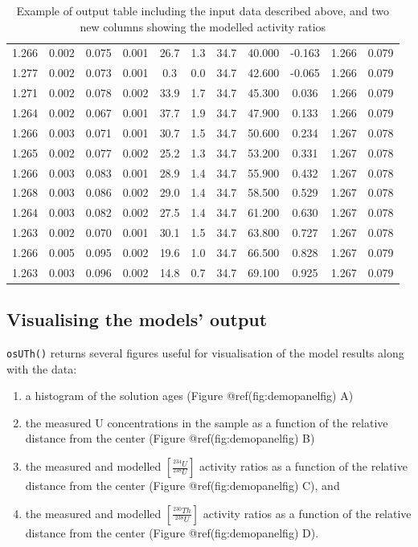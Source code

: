 \documentclass[]{elsarticle} %
\providecommand{\tightlist}{%
  \setlength{\itemsep}{0pt}\setlength{\parskip}{0pt}}
\begin{document}
\begin{table}[ht]
\begin{tabular}{ccccccccccc}
  1.266 & 0.002 & 0.075 & 0.001 & 26.7 & 1.3 & 34.7 & 40.000 & -0.163 & 1.266 & 0.079 \\ 
  1.277 & 0.002 & 0.073 & 0.001 & 0.3 & 0.0 & 34.7 & 42.600 & -0.065 & 1.266 & 0.079 \\ 
  1.271 & 0.002 & 0.078 & 0.002 & 33.9 & 1.7 & 34.7 & 45.300 & 0.036 & 1.266 & 0.079 \\ 
  1.264 & 0.002 & 0.067 & 0.001 & 37.7 & 1.9 & 34.7 & 47.900 & 0.133 & 1.266 & 0.079 \\ 
  1.266 & 0.003 & 0.071 & 0.001 & 30.7 & 1.5 & 34.7 & 50.600 & 0.234 & 1.267 & 0.078 \\ 
  1.265 & 0.002 & 0.077 & 0.002 & 25.2 & 1.3 & 34.7 & 53.200 & 0.331 & 1.267 & 0.078 \\ 
  1.266 & 0.003 & 0.083 & 0.001 & 28.9 & 1.4 & 34.7 & 55.900 & 0.432 & 1.267 & 0.078 \\ 
  1.268 & 0.003 & 0.086 & 0.002 & 29.0 & 1.4 & 34.7 & 58.500 & 0.529 & 1.267 & 0.078 \\ 
  1.264 & 0.003 & 0.082 & 0.002 & 27.5 & 1.4 & 34.7 & 61.200 & 0.630 & 1.267 & 0.078 \\ 
  1.263 & 0.002 & 0.070 & 0.001 & 30.1 & 1.5 & 34.7 & 63.800 & 0.727 & 1.267 & 0.078 \\ 
  1.266 & 0.005 & 0.095 & 0.002 & 19.6 & 1.0 & 34.7 & 66.500 & 0.828 & 1.267 & 0.079 \\ 
  1.263 & 0.003 & 0.096 & 0.002 & 14.8 & 0.7 & 34.7 & 69.100 & 0.925 & 1.267 & 0.079 \\ 
   \hline
\end{tabular}
\caption{\label{tab:outputdata}Example of output table including the input data described above, and two new columns showing the modelled activity ratios} 
\end{table}

\hypertarget{visualising-the-models-output}{%
\subsection{Visualising the models' output}\label{visualising-the-models-output}}

\texttt{osUTh()} returns several figures useful for visualisation of the model results along with the data:

\begin{enumerate}
\def\labelenumi{\arabic{enumi}.}
\tightlist
\item
  a histogram of the solution ages (Figure @ref(fig:demopanelfig) A)
\item
  the measured U concentrations in the sample as a function of the relative distance from the center (Figure @ref(fig:demopanelfig) B)
\item
  the measured and modelled \([\frac{^{234}U}{^{238}U}]\) activity ratios as a function of the relative distance from the center (Figure @ref(fig:demopanelfig) C), and
\item
  the measured and modelled \([\frac{^{230}Th}{^{238}U}]\) activity ratios as a function of the relative distance from the center (Figure @ref(fig:demopanelfig) D).
\end{enumerate}
\end{document}
